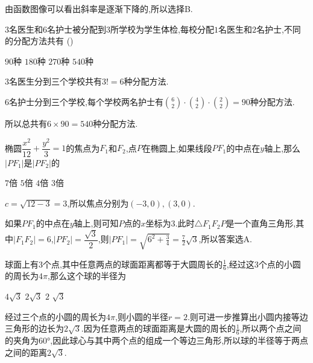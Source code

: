 \begin{questions}
	\begin{solution}
		由函数图像可以看出斜率是逐渐下降的,所以选择B.
	\end{solution}

	\question $3$名医生和$6$名护士被分配到$3$所学校为学生体检,每校分配$1$名医生和$2$名护士,不同的分配方法共有\hfill
	(\hspace{1cm})

	\begin{oneparchoices}
		\choice $90$种
		\choice $180$种
		\choice $270$种
		\CorrectChoice $540$种
	\end{oneparchoices}

	\begin{solution}
		$3$名医生分到三个学校共有$3!=6$种分配方法.

		$6$名护士分到三个学校,每个学校两名护士有$\displaystyle\binom{6}{2}\cdot\binom{4}{2}\cdot\binom{2}{2}=90$种分配方法.

		所以总共有$6\times90=540$种分配方法.
	\end{solution}

	\question 椭圆$\dfrac{x^2}{12} + \dfrac{y^2}{3} =
		1$的焦点为$F_1$和$F_2$,点$P$在椭圆上,如果线段$PF_1$的中点在$y$轴上,那么$|PF_1|$是$|PF_2|$的\hfs

	\begin{oneparchoices}
		\CorrectChoice $7$倍
		\choice $5$倍
		\choice $4$倍
		\choice $3$倍
	\end{oneparchoices}

	\begin{solution}
		$c=\sqrt{12-3} = 3$,所以焦点分别为$(-3,0), (3,0)$.

		如果$PF_1$的中点在$y$轴上,则可知$P$点的$x$坐标为$3$.此时$\triangle{F_1F_2P}$是一个直角三角形,其中$|F_1F_2|=6$,$|PF_2|=\dfrac{\sqrt{3}}{2}$,则$|PF_1|=\sqrt{6^2+\frac{3}{4}}=\frac72\sqrt{3}$,所以答案选A.
	\end{solution}

	\question
	球面上有$3$个点,其中任意两点的球面距离都等于大圆周长的$\frac16$,经过这$3$个点的小圆的周长为$4\pi$,那么这个球的半径为
	\hfs

	\begin{oneparchoices}
		\choice $4\sqrt{3}$
		\CorrectChoice $2\sqrt{3}$
		\choice $2$
		\choice $\sqrt{3}$
	\end{oneparchoices}

	\begin{solution}
		经过三个点的小圆的周长为$4\pi$,则小圆的半径$r=2$.则可进一步推算出小圆内接等边三角形的边长为$2\sqrt{3}$.因为任意两点的球面距离是大圆的周长的$\frac16$,所以两个点之间的夹角为$\ang{60}$,因此球心与其中两个点的组成一个等边三角形,所以球的半径等于两点之间的距离$2\sqrt{3}$.
	\end{solution}


\end{questions}
